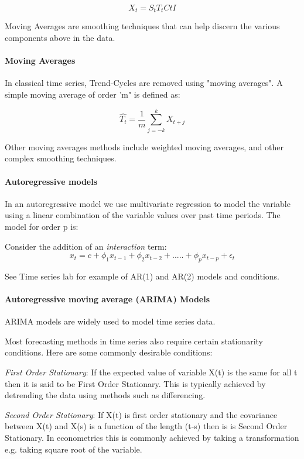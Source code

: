 \documentclass[10pt]{article}\usepackage[]{graphicx}\usepackage[]{color}
\begin{document}
$$ X_{t} = S_{t} T_{t} C{t} I
$$

Moving Averages are smoothing techniques that can help discern the various components above in the data.

\paragraph{Moving Averages}
In classical time series, Trend-Cycles are removed using "moving averages". A simple moving average of order 'm" is defined as:

$$
    	\widehat{T_{t}} = \frac{1}{m}{\sum_{j=-k}^{k}} X_{t+j}
  	$$

Other moving averages methods include weighted moving averages, and other complex smoothing techniques.


\paragraph{Autoregressive models}

In an autoregressive model we use multivariate regression to model the variable using a linear combination of the variable values over past time periods. The model for order p is:

Consider the addition of an \emph{interaction} term:
  	$$
  		x_t = c + \phi_1 x_{t-1} + \phi_2 x_{t-2} + .....+\phi_{p} x_{t-p}+ \epsilon_{t}
  	$$

See Time series lab for example of AR(1) and AR(2) models and conditions.



\paragraph{Autoregressive moving average (ARIMA) Models}

ARIMA models are widely used to model time series data. 

Most forecasting methods in time series also require certain stationarity conditions. Here are some commonly desirable conditions:

\emph{First Order Stationary}: If the expected value of variable X(t) is the same for all t then it is said to be First Order Stationary. This is typically achieved by detrending the data using methods such as differencing.

\emph{Second Order Stationary}: If X(t) is first order stationary and the covariance between X(t) and X(s) is a function of the length (t-s) then is is Second Order Stationary. In econometrics this is commonly achieved by taking a transformation e.g. taking square root of the variable.
\end{document}

